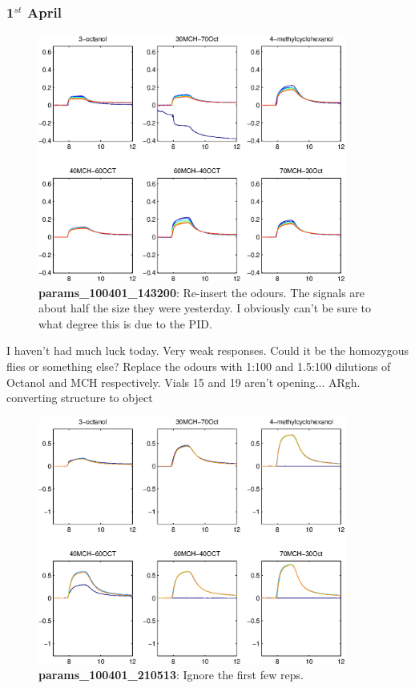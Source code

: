 \documentclass[a4paper]{report}
\begin{document}
\subsubsection{1$^{st}$ April}

\begin{figure}[h]
\centering
\includegraphics[width=4in]{params_100401_143200.eps}
\caption{\textbf{params\_100401\_143200}: Re-insert the odours. The
  signals are about half the size they were yesterday. I obviously
  can't be sure to what degree this is due to the PID. }
\end{figure}


I haven't had much luck today. Very weak responses. Could it be the
homozygous flies or something else? Replace the odours with 1:100 and
1.5:100 dilutions of Octanol and MCH respectively. Vials 15 and 19
aren't opening... ARgh.
converting structure to object

\begin{figure}[h]
\centering
\includegraphics[width=4in]{params_100401_210513.eps}
\caption{\textbf{params\_100401\_210513}: Ignore the first few reps. }
\end{figure}
\end{document}
